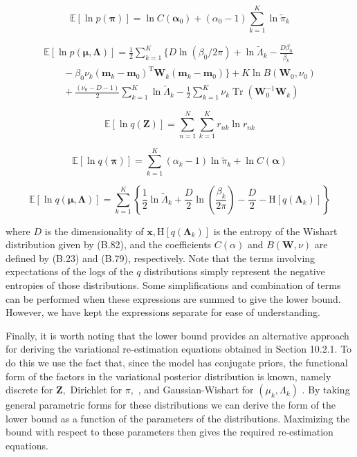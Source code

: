 \documentclass[
  10
]{article}
\begin{document}
\[
\mathbb {E} [ \ln p (\boldsymbol {\pi}) ] = \ln C (\boldsymbol {\alpha} _ {0}) + (\alpha_ {0} - 1) \sum_ {k = 1} ^ {K} \ln \widetilde {\pi} _ {k}\tag{10.73}
\]

\[
\begin{array}{l} \mathbb {E} [ \ln p (\boldsymbol {\mu}, \boldsymbol {\Lambda}) ] = \frac {1}{2} \sum_ {k = 1} ^ {K} \Bigg \{D \ln (\beta_ {0} / 2 \pi) + \ln \widetilde {\Lambda} _ {k} - \frac {D \beta_ {0}}{\beta_ {k}} \\ \qquad - \beta_ {0} \nu_ {k} (\mathbf {m} _ {k} - \mathbf {m} _ {0}) ^ {\mathrm{T}} \mathbf {W} _ {k} (\mathbf {m} _ {k} - \mathbf {m} _ {0}) \Bigg \} + K \ln B (\mathbf {W} _ {0}, \nu_ {0}) \\ \qquad + \frac {(\nu_ {0} - D - 1)}{2} \sum_ {k = 1} ^ {K} \ln \widetilde {\Lambda} _ {k} - \frac {1}{2} \sum_ {k = 1} ^ {K} \nu_ {k} \operatorname{Tr} (\mathbf {W} _ {0} ^ {- 1} \mathbf {W} _ {k}) \end{array}\tag{10.74}
\]

\[
\mathbb {E} [ \ln q (\mathbf {Z}) ] = \sum_ {n = 1} ^ {N} \sum_ {k = 1} ^ {K} r _ {n k} \ln r _ {n k}\tag{10.75}
\]

\[
\mathbb {E} [ \ln q (\boldsymbol {\pi}) ] = \sum_ {k = 1} ^ {K} \left(\alpha_ {k} - 1\right) \ln \widetilde {\pi} _ {k} + \ln C (\boldsymbol {\alpha})\tag{10.76}
\]

\[
\mathbb {E} [ \ln q (\pmb {\mu}, \pmb {\Lambda}) ] = \sum_ {k = 1} ^ {K} \left\{\frac {1}{2} \ln \widetilde {\Lambda} _ {k} + \frac {D}{2} \ln \left(\frac {\beta_ {k}}{2 \pi}\right) - \frac {D}{2} - \mathrm{H} [ q (\pmb {\Lambda} _ {k}) ] \right\}\tag{10.77}
\]

where \(D\) is the dimensionality of
\(\mathbf { x } , \mathrm { H } [ q ( \pmb { \Lambda } _ { k } ) ]\) is
the entropy of the Wishart distribution given by (B.82), and the
coefficients \(C ( \alpha )\) and \(B ( { \mathbf W } , \nu )\) are
defined by (B.23) and (B.79), respectively. Note that the terms
involving expectations of the logs of the \(q\) distributions simply
represent the negative entropies of those distributions. Some
simplifications and combination of terms can be performed when these
expressions are summed to give the lower bound. However, we have kept
the expressions separate for ease of understanding.

Finally, it is worth noting that the lower bound provides an alternative
approach for deriving the variational re-estimation equations obtained
in Section 10.2.1. To do this we use the fact that, since the model has
conjugate priors, the functional form of the factors in the variational
posterior distribution is known, namely discrete for \(\mathbf { Z } ,\)
Dirichlet for \(\pi ,\) , and Gaussian-Wishart for
\(( \mu _ { k } , \Lambda _ { k } )\) . By taking general parametric
forms for these distributions we can derive the form of the lower bound
as a function of the parameters of the distributions. Maximizing the
bound with respect to these parameters then gives the required
re-estimation equations.
\end{document}
